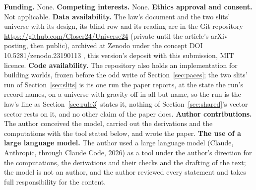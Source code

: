 \documentclass[pdflatex,sn-mathphys-num]{sn-jnl}
\theoremstyle{thmstyleone}
\theoremstyle{thmstyletwo}
\begin{document}
\noindent\textbf{Funding.} None. \textbf{Competing interests.} None. \textbf{Ethics approval and consent.} Not applicable. \textbf{Data availability.} The law's document and the two slits' universe with its design, its blind row and its reading are in the Git repository \url{https://github.com/Closer24/Universe24} (private until the article's arXiv posting, then public), archived at Zenodo under the concept DOI 10.5281/zenodo.23190113 \cite{zenodo}, this version's deposit with this submission, MIT licence. \textbf{Code availability.} The repository also holds an implementation for building worlds, frozen before the odd write of Section~\ref{sec:paces}; the two slits' run of Section~\ref{sec:slits} is its one run the paper reports, at the state the run's record names, on a universe with gravity off in all but name, so the run is the law's line as Section~\ref{sec:rule3} states it, nothing of Section~\ref{sec:shared}'s vector sector rests on it, and no other claim of the paper does. \textbf{Author contributions.} The author conceived the model, carried out the derivations and the computations with the tool stated below, and wrote the paper. \textbf{The use of a large language model.} The author used a large language model (Claude, Anthropic, through Claude Code, 2026) as a tool under the author's direction for the computations, the derivations and their checks and the drafting of the text; the model is not an author, and the author reviewed every statement and takes full responsibility for the content.
\vspace{-6pt}
\end{document}

